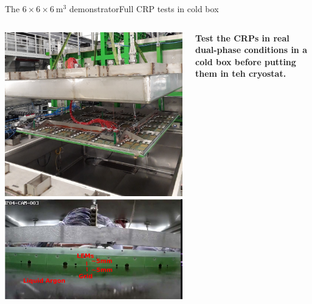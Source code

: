 \documentclass[10pt]{beamer}
\begin{document}
    \begin{frame}{The \texorpdfstring{$6 \times 6 \times \SI{6}{\meter\cubed}$}{666} demonstrator}{Full CRP tests in cold box}
   		\begin{columns}
   			\begin{column}{0.4\textwidth}
   				\includegraphics[width=\textwidth]{figures/666/crp_inserting_coldbox.png}\\
   				\includegraphics[width=\textwidth]{figures/666/in_coldbox.png}
    		\end{column}
    		\begin{column}{0.6\textwidth}
    			\begin{scriptsize}
	    			\textbf{Test the CRPs in real dual-phase conditions in a cold box before putting them in teh cryostat.}\\
	    			

\end{scriptsize}
\end{column}
\end{columns}
\end{frame}
\end{document}

